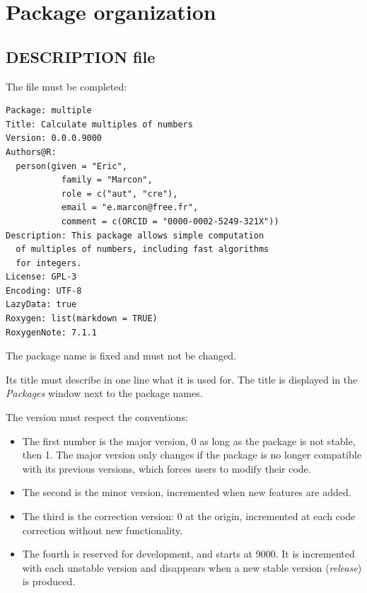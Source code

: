 \documentclass[
  12pt,
  american,
  a4paper,
  extrafontsizes,onecolumn,openright
  ]{memoir}
\providecommand{\tightlist}{%
  \setlength{\itemsep}{0pt}\setlength{\parskip}{0pt}}
\begin{document}
\hypertarget{package-organization}{%
\section{Package organization}\label{package-organization}}

\hypertarget{sec:package-description}{%
\subsection{DESCRIPTION file}\label{sec:package-description}}

The file must be completed:

\begin{verbatim}
Package: multiple
Title: Calculate multiples of numbers
Version: 0.0.0.9000
Authors@R: 
  person(given = "Eric",
           family = "Marcon",
           role = c("aut", "cre"),
           email = "e.marcon@free.fr",
           comment = c(ORCID = "0000-0002-5249-321X"))
Description: This package allows simple computation
  of multiples of numbers, including fast algorithms
  for integers.
License: GPL-3
Encoding: UTF-8
LazyData: true
Roxygen: list(markdown = TRUE)
RoxygenNote: 7.1.1
\end{verbatim}

The package name is fixed and must not be changed.

Its title must describe in one line what it is used for.
The title is displayed in the \emph{Packages} window next to the package names.

The version must respect the conventions:

\begin{itemize}
\tightlist
\item
  The first number is the major version, 0 as long as the package is not stable, then 1.
  The major version only changes if the package is no longer compatible with its previous versions, which forces users to modify their code.
\item
  The second is the minor version, incremented when new features are added.
\item
  The third is the correction version: 0 at the origin, incremented at each code correction without new functionality.
\item
  The fourth is reserved for development, and starts at 9000.
  It is incremented with each unstable version and disappears when a new stable version (\emph{release}) is produced.
\end{itemize}
\end{document}

